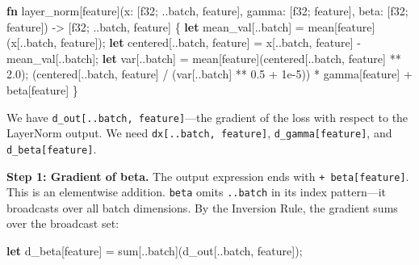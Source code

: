 \documentclass[11pt,titlepage]{article}
\newenvironment{Shaded}{}{}
\newcommand{\DataTypeTok}[1]{\textcolor[rgb]{0.56,0.13,0.00}{#1}}
\newcommand{\DecValTok}[1]{\textcolor[rgb]{0.25,0.63,0.44}{#1}}
\newcommand{\KeywordTok}[1]{\textcolor[rgb]{0.00,0.44,0.13}{\textbf{#1}}}
\newcommand{\NormalTok}[1]{#1}
\newcommand{\OperatorTok}[1]{\textcolor[rgb]{0.40,0.40,0.40}{#1}}
\begin{document}
\begin{Shaded}
\begin{Highlighting}[]
\KeywordTok{fn}\NormalTok{ layer_norm[feature](x: }\OperatorTok{[}\DataTypeTok{f32}\NormalTok{; ..batch, feature}\OperatorTok{]}\NormalTok{,}
\NormalTok{                      gamma: }\OperatorTok{[}\DataTypeTok{f32}\NormalTok{; feature}\OperatorTok{]}\NormalTok{,}
\NormalTok{                      beta: }\OperatorTok{[}\DataTypeTok{f32}\NormalTok{; feature}\OperatorTok{]}\NormalTok{)}
\NormalTok{    -> }\OperatorTok{[}\DataTypeTok{f32}\NormalTok{; ..batch, feature}\OperatorTok{]}
\OperatorTok{\{}
    \KeywordTok{let}\NormalTok{ mean_val}\OperatorTok{[}\NormalTok{..batch}\OperatorTok{]}\NormalTok{ = mean}\OperatorTok{[}\NormalTok{feature}\OperatorTok{]}\NormalTok{(x}\OperatorTok{[}\NormalTok{..batch, feature}\OperatorTok{]}\NormalTok{);}
    \KeywordTok{let}\NormalTok{ centered}\OperatorTok{[}\NormalTok{..batch, feature}\OperatorTok{]}\NormalTok{ = x}\OperatorTok{[}\NormalTok{..batch, feature}\OperatorTok{]}\NormalTok{ - mean_val}\OperatorTok{[}\NormalTok{..batch}\OperatorTok{]}\NormalTok{;}
    \KeywordTok{let}\NormalTok{ var}\OperatorTok{[}\NormalTok{..batch}\OperatorTok{]}\NormalTok{ = mean}\OperatorTok{[}\NormalTok{feature}\OperatorTok{]}\NormalTok{(centered}\OperatorTok{[}\NormalTok{..batch, feature}\OperatorTok{]}\NormalTok{ ** }\DecValTok{2.0}\NormalTok{);}
\NormalTok{    (centered}\OperatorTok{[}\NormalTok{..batch, feature}\OperatorTok{]}\NormalTok{ / (var}\OperatorTok{[}\NormalTok{..batch}\OperatorTok{]}\NormalTok{ ** }\DecValTok{0.5}\NormalTok{ + }\DecValTok{1}\NormalTok{e-}\DecValTok{5}\NormalTok{)) * gamma}\OperatorTok{[}\NormalTok{feature}\OperatorTok{]}\NormalTok{ + beta}\OperatorTok{[}\NormalTok{feature}\OperatorTok{]}
\OperatorTok{\}}
\end{Highlighting}
\end{Shaded}

We have \texttt{d\_out{[}..batch,\ feature{]}}---the gradient of the
loss with respect to the LayerNorm output. We need
\texttt{dx{[}..batch,\ feature{]}}, \texttt{d\_gamma{[}feature{]}}, and
\texttt{d\_beta{[}feature{]}}.

\textbf{Step 1: Gradient of beta.} The output expression ends with
\texttt{+\ beta{[}feature{]}}. This is an elementwise addition.
\texttt{beta} omits \texttt{..batch} in its index pattern---it
broadcasts over all batch dimensions. By the Inversion Rule, the
gradient sums over the broadcast set:

\begin{Shaded}
\begin{Highlighting}[]
\KeywordTok{let}\NormalTok{ d_beta}\OperatorTok{[}\NormalTok{feature}\OperatorTok{]}\NormalTok{ = sum}\OperatorTok{[}\NormalTok{..batch}\OperatorTok{]}\NormalTok{(d_out}\OperatorTok{[}\NormalTok{..batch, feature}\OperatorTok{]}\NormalTok{);}
\end{Highlighting}
\end{Shaded}
\end{document}
